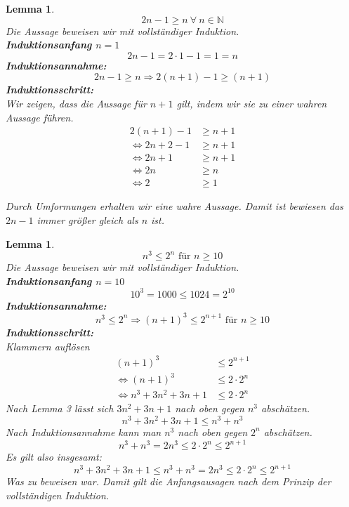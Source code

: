 \documentclass{article}
\begin{document}
    \newtheorem{lemma1}[lemma_counter]{Lemma}
    \begin{lemma1}
        \[ 2n -1 \geq n \: \forall \: n \in \mathbb{N} \]
        Die Aussage beweisen wir mit vollständiger Induktion. \\
        \textbf{Induktionsanfang \(n=1\)}
        \[2n - 1 = 2 \cdot 1 - 1 = 1 = n\]
        \textbf{Induktionsannahme:}
        \[2n - 1 \geq n \Rightarrow 2(n+1) -1 \geq (n+1)\]
        \textbf{Induktionsschritt:} \\
        Wir zeigen, dass die Aussage für \(n+1\) gilt, indem wir sie zu einer wahren Aussage führen.
        \begin{align*}
            2 (n+1) - 1 & \geq n + 1 \\
            \Leftrightarrow 2n + 2 - 1 & \geq n + 1 \\
            \Leftrightarrow 2n + 1 & \geq n + 1 \\
            \Leftrightarrow 2n & \geq n \\
            \Leftrightarrow 2 & \geq 1 
        \end{align*}
   
        Durch Umformungen erhalten wir eine wahre Aussage. Damit ist bewiesen das \(2n - 1\) immer größer gleich als \(n\) ist.
    \end{lemma1}

    \newtheorem{lemma2}[lemma_counter]{Lemma}
    \begin{lemma2}
        \[ n^3 \leq 2^n \text{ für } n \geq 10 \]
        Die Aussage beweisen wir mit vollständiger Induktion. \\
        \textbf{Induktionsanfang \(n=10\)}
        \[10^3 = 1000 \leq 1024 = 2^{10} \]
        \textbf{Induktionsannahme:}
        \[ n^3 \leq 2^n \Rightarrow {(n+1)}^3 \leq 2^{ n+1 } \text{ für } n \geq 10 \]
        \textbf{Induktionsschritt:} \\
        Klammern auflösen
        \begin{align*}
            {(n+1)}^3 & \leq 2^{ n+1 } \\
            \Leftrightarrow {(n+1)}^3 & \leq 2 \cdot 2^n \\
            \Leftrightarrow n^3 + 3n^2 + 3n + 1 & \leq 2 \cdot 2^n
        \end{align*} 
        Nach Lemma 3 lässt sich \(3n^2 + 3n + 1\) nach oben gegen \(n^3\) abschätzen.
        \[ n^3 + 3n^2 + 3n + 1 \leq n^3 + n^3 \]
        Nach Induktionsannahme kann man \(n^3\) nach oben gegen \(2^n\) abschätzen.
        \[ n^3 + n^3 = 2 n^3 \leq 2 \cdot 2^n \leq 2^{n+1} \]
        Es gilt also insgesamt:
        \[n^3 + 3n^2 + 3n + 1 \leq n^3 + n^3 = 2 n^3 \leq 2 \cdot 2^n \leq 2^{n+1} \]
        Was zu beweisen war. Damit gilt die Anfangsausagen nach dem Prinzip der vollständigen Induktion.
    \end{lemma2}
\end{document}
